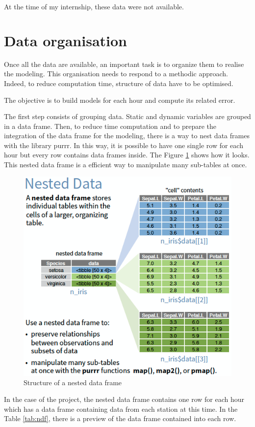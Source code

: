 \documentclass[12pt,twoside]{reedthesis}
\theoremstyle{definition}
\theoremstyle{definition}
\theoremstyle{definition}
\theoremstyle{remark}
\begin{document}
At the time of my internship, these data were not available.

\section{Data organisation}\label{data-organisation}

Once all the data are available, an important task is to organize them
to realise the modeling. This organisation needs to respond to a
methodic approach. Indeed, to reduce computation time, structure of data
have to be optimised.

The objective is to build models for each hour and compute its related
error.

The first step consists of grouping data. Static and dynamic variables
are grouped in a data frame. Then, to reduce time computation and to
prepare the integration of the data frame for the modeling, there is a
way to nest data frames with the library purrr. In this way, it is
possible to have one single row for each hour but every row contains
data frames inside. The Figure \ref{fig:nested} shows how it looks. This
nested data frame is a efficient way to manipulate many sub-tables at
once.
\begin{figure}

{\centering \includegraphics[width=0.5\linewidth]{figure/purrr_nest} 

}

\caption{Structure of a nested data frame}\label{fig:nested}
\end{figure}
In the case of the project, the nested data frame contains one row for
each hour which has a data frame containing data from each station at
this time. In the Table \ref{tab:ndf}, there is a preview of the data
frame contained into each row.
\end{document}
